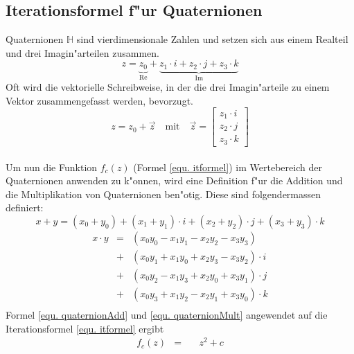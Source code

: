 \begin{refsection}
	\subsection{Iterationsformel f"ur Quaternionen}
		Quaternionen $\mathbb{H}$ sind vierdimensionale Zahlen und setzen sich aus einem Realteil und drei Imagin"arteilen zusammen.
		\begin{equation}
			z = \underbrace{z_0}_{\operatorname{Re}} + \underbrace{z_1\cdot i + z_2\cdot j + z_3\cdot k}_{\operatorname{Im}}
			\label{equ. quaternion}
		\end{equation}
		Oft wird die vektorielle Schreibweise, in der die drei Imagin"arteile zu einem Vektor zusammengefasst werden, bevorzugt.
		\begin{equation}
			z = z_0 + \vec z \quad \text{mit}\quad\vec z= \begin{bmatrix}z_1\cdot i\\ z_2\cdot j\\z_3\cdot k\end{bmatrix}
			\label{equ. quaternionVec}
		\end{equation}\\[5cm]
		Um nun die Funktion $f_c(z)$ (Formel \ref{equ. itformel}) im Wertebereich der Quaternionen anwenden zu k"onnen, wird eine Definition f"ur die Addition und die Multiplikation von Quaternionen ben"otig. Diese sind folgendermassen definiert: \cite{wikiQuaternionen}
		\begin{equation}
			x + y = (x_0+y_0) + (x_1+y_1)\cdot i + (x_2+y_2)\cdot j + (x_3+y_3)\cdot k
			\label{equ. quaternionAdd}
		\end{equation}
		\begin{equation}
			\begin{array}{lcl}
			x\cdot y & = & (x_0y_0 - x_1y_1 - x_2y_2 - x_3y_3)\\
				 & + & (x_0y_1 + x_1y_0 + x_2y_3 - x_3y_2)\cdot i\\
				 & + & (x_0y_2 - x_1y_3 + x_2y_0 + x_3y_1)\cdot j\\
				 & + & (x_0y_3 + x_1y_2 - x_2y_1 + x_3y_0)\cdot k\\
			\end{array}
			\label{equ. quaternionMult}
		\end{equation}
		Formel \ref{equ. quaternionAdd} und \ref{equ. quaternionMult} angewendet auf die Iterationsformel \ref{equ. itformel} ergibt
		\begin{equation}
			\begin{array}{lcl}
			f_c(z) 	& = &\;\;\;\, z^2+c\\[0.3cm]

\end{array}
\end{equation}
\end{refsection}
